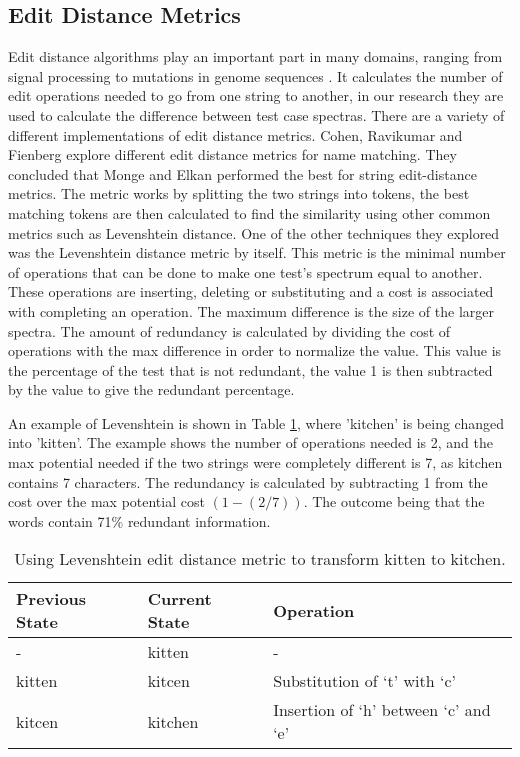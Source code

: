 \subsection{Edit Distance Metrics}
\label{editdistbg}
Edit distance algorithms play an important part in many domains, ranging from signal processing to mutations in genome sequences \cite{navarro2001guided}. It calculates the number of edit operations needed to go from one string to another, in our research they are used to calculate the difference between test case spectras. There are a variety of different implementations of edit distance metrics. Cohen, Ravikumar and Fienberg \cite{cohen2003comparison} explore different edit distance metrics for name matching. They concluded that Monge and Elkan \cite{monge1997efficient} performed the best for string edit-distance metrics. The metric works by splitting the two strings into tokens, the best matching tokens are then calculated to find the similarity using other common metrics such as Levenshtein distance. One of the other techniques they explored was the Levenshtein distance \cite{levenshtein1966binary} metric by itself. This metric is the minimal number of operations that can be done to make one test's spectrum equal to another. These operations are inserting, deleting or substituting and a cost is associated with completing an operation. The maximum difference is the size of the larger spectra. The amount of redundancy is calculated by dividing the cost of operations with the max difference in order to normalize the value. This value is the percentage of the test that is not redundant, the value 1 is then subtracted by the value to give the redundant percentage.

An example of Levenshtein is shown in Table \ref{levenTable}, where 'kitchen' is being changed into 'kitten'. The example shows the number of operations needed is 2, and the max potential needed if the two strings were completely different is 7, as kitchen contains 7 characters. The redundancy is calculated by subtracting 1 from the cost over the max potential cost $(1 - (2/7)) $. The outcome being that the words contain 71\% redundant information. 

\begin{table}[H]
\centering

\begin{tabular}{|l|l|l|}
\hline
{\bf Previous State} & {\bf Current State} & {\bf Operation}                      \\ \hline
-                    & kitten              & -                                    \\ \hline
kitten               & kitcen              & Substitution of `t' with `c'         \\ \hline
kitcen               & kitchen             & Insertion of `h' between `c' and `e' \\ \hline
\end{tabular}
\caption{Using Levenshtein edit distance metric to transform kitten to kitchen.}
\label{levenTable}
\end{table}

